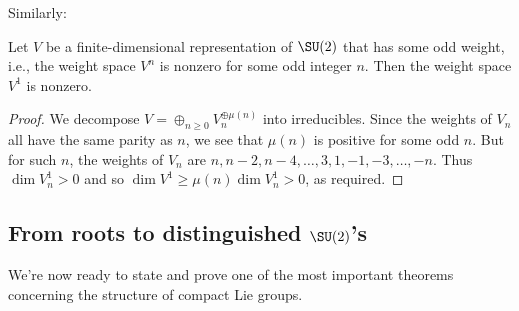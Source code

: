 \documentclass[reqno]{amsart} 
\begin{document}
Similarly:
\begin{lemma}\label{lem:key-for-rational-multiples-of-roots}
  Let $V$ be a finite-dimensional representation of $\SU(2)$ that has some odd weight, i.e., the weight space $V^n$ is nonzero for some odd integer $n$.  Then the weight space $V^1$ is nonzero.
\end{lemma}
\begin{proof}
  We decompose $V = \oplus_{n \geq 0} V_n^{\oplus \mu(n)}$ into irreducibles.  Since the weights of $V_n$ all have the same parity as $n$, we see that $\mu(n)$ is positive for some odd $n$.  But for such $n$, the weights of $V_n$ are $n,n-2,n-4,\dotsc,3,1,-1,-3,\dotsc,-n$.  Thus $\dim V_n^1 > 0$ and so $\dim V^1 \geq \mu(n) \dim V_n^1 > 0$, as required.
\end{proof}

\subsection{From roots to distinguished \texorpdfstring{$\SU(2)$}{SU(2)}'s}\label{sec:from-roots-dist}
We're now ready to state and prove one of the most important theorems concerning the structure of compact Lie groups.
\end{document}
